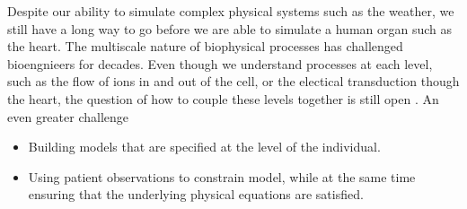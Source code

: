Despite our ability to simulate complex physical systems such as
the weather, we still have a long way to go before we are able to
simulate a human organ such as the heart. The multiscale nature of
biophysical processes has challenged bioengnieers for decades.
Even though we understand processes at each level, such as the flow of
ions in and out of the cell, or the electical transduction though the
heart, the question of how to couple these levels together is still open
\cite{noble2002modeling}.
An even greater challenge 






\begin{itemize}
\item Building models that are specified at the level of the
  individual.
\item Using patient observations to constrain model, while at the same
  time ensuring that the underlying physical equations are satisfied. 
\end{itemize}








\pagebreak







